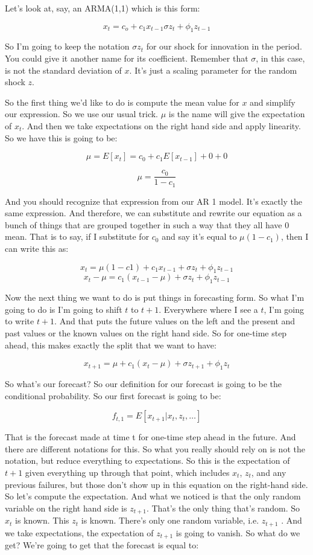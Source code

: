 \documentclass{article}
\begin{document}
Let's look at, say, an ARMA(1,1)  which is this form:

$$ x_t = c_o + c_1 x_{t-1} \sigma z_t + \phi_1 z_{t-1} $$

So I'm going to keep the notation $\sigma z_t$ for our shock for innovation in the period.
You could give it another name for its coefficient.
Remember that $\sigma$, in this case,
is not the standard deviation of $x$.
It's just a scaling parameter for the random shock $z$.

So the first thing we'd like to do
is compute the mean value for $x$ and simplify our expression.
So we use our usual trick.
$\mu$ is the name will give the expectation of $x_t$.
And then we take expectations on the right hand side
and apply linearity.
So we have this is going to be:


$$ \mu = E[x_t] = c_0 + c_1 E[x_{t-1}] + 0 + 0 $$

$$ \mu = \frac{c_0}{1-c_1} $$


And you should recognize that expression from our AR 1 model.
It's exactly the same expression.
And therefore, we can substitute and rewrite our equation
as a bunch of things that are grouped together in such a way
that they all have 0 mean.
That is to say, if I substitute for $c_0$
and say it's equal to $\mu (1 - c_1)$,
then I can write this as:

$$ x_t = \mu (1 - c1) + c_1 x_{t-1} + \sigma z_t + \phi_1 z_{t-1} $$
$$ x_t - \mu =   c_1 (x_{t-1} - \mu)+ \sigma z_t + \phi_1 z_{t-1} $$


Now the next thing we want to do is put things
in forecasting form.
So what I'm going to do is I'm going to shift $t$ to $t+1$.
Everywhere where I see a $t$, I'm going to write $t+1$.
And that puts the future values on the left
and the present and past values or the known
values on the right hand side.
So for one-time step ahead, this makes exactly the split
that we want to have:

$$ x_{t+1}  =  \mu + c_1 (x_{t} - \mu)+ \sigma z_{t+1} + \phi_1 z_{t} $$


So what's our forecast?
So our definition for our forecast
is going to be the conditional probability.
So our first forecast is going to be:

$$f_{t,1} = E[x_{t+1}|x_t, z_t, \dots] $$

That is the forecast made at time t for one-time step
ahead in the future.
And there are different notations for this.
So what you really should rely on is not the notation,
but reduce everything to expectations.
So this is the expectation of $t+1$ given everything
up through that point, which includes $x_t$, $z_t$,
and any previous failures, but those
don't show up in this equation on the right-hand side.
So let's compute the expectation.
And what we noticed is that the only random variable
on the right hand side is $z_{t+1}$.
That's the only thing that's random.
So $x_t$ is known.
This $z_t$ is known.
There's only one random variable, i.e. $z_{t+1}$ .
And we take expectations, the expectation of $z_{t+1}$
is going to vanish.
So what do we get?
We're going to get that the forecast is equal to:
\end{document}
